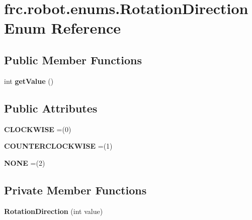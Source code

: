 \hypertarget{enumfrc_1_1robot_1_1enums_1_1_rotation_direction}{}\section{frc.\+robot.\+enums.\+Rotation\+Direction Enum Reference}
\label{enumfrc_1_1robot_1_1enums_1_1_rotation_direction}
\subsection*{Public Member Functions}
\begin{DoxyCompactItemize}
\item 
\mbox{\label{enumfrc_1_1robot_1_1enums_1_1_rotation_direction_ace9f37b8d7e806094a1db6158678acc8}} 
int {\bfseries get\+Value} ()
\end{DoxyCompactItemize}
\subsection*{Public Attributes}
\begin{DoxyCompactItemize}
\item 
\mbox{\label{enumfrc_1_1robot_1_1enums_1_1_rotation_direction_a22f7babf8aa8b1517773586669f64926}} 
{\bfseries C\+L\+O\+C\+K\+W\+I\+SE} =(0)
\item 
\mbox{\label{enumfrc_1_1robot_1_1enums_1_1_rotation_direction_a48a0732603d81afd441bd9dd7e89b8a0}} 
{\bfseries C\+O\+U\+N\+T\+E\+R\+C\+L\+O\+C\+K\+W\+I\+SE} =(1)
\item 
\mbox{\label{enumfrc_1_1robot_1_1enums_1_1_rotation_direction_adb5218dea51631d9d0770c70d31f4f43}} 
{\bfseries N\+O\+NE} =(2)
\end{DoxyCompactItemize}
\subsection*{Private Member Functions}
\begin{DoxyCompactItemize}
\item 
\mbox{\label{enumfrc_1_1robot_1_1enums_1_1_rotation_direction_a1b52347f8f6b331c63a002db8f2fc876}} 
{\bfseries Rotation\+Direction} (int value)
\end{DoxyCompactItemize}
